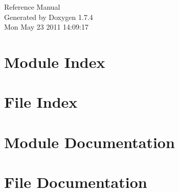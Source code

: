 \documentclass[a4paper]{book}
\begin{document}
\hypersetup{pageanchor=false}
\begin{titlepage}
\vspace*{7cm}
\begin{center}
{\Large Reference Manual}\\
\vspace*{1cm}
{\large Generated by Doxygen 1.7.4}\\
\vspace*{0.5cm}
{\small Mon May 23 2011 14:09:17}\\
\end{center}
\end{titlepage}
\clearemptydoublepage
{}
\tableofcontents
\clearemptydoublepage
{}
\hypersetup{pageanchor=true}
\chapter{Module Index}

\chapter{File Index}

\chapter{Module Documentation}


\chapter{File Documentation}

















\printindex
\end{document}

